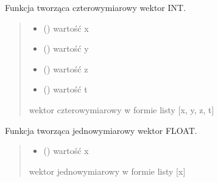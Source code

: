 \documentclass[a4paper,10pt,openany,english]{sphinxmanual}
\begin{document}
\begin{fulllineitems}
\label{\detokenize{js/js-functions:vector4i}}
\pysigstartsignatures
\pysiglinewithargsret
{}
{\sphinxparamcomma {}\sphinxparamcomma {}\sphinxparamcomma {}}
{}
\pysigstopsignatures
\sphinxAtStartPar
Funkcja tworząca czterowymiarowy wektor INT.
\begin{quote}\begin{description}
\begin{itemize}
\item {} 
\sphinxAtStartPar
{} () \textendash{} wartość x

\item {} 
\sphinxAtStartPar
{} () \textendash{} wartość y

\item {} 
\sphinxAtStartPar
{} () \textendash{} wartość z

\item {} 
\sphinxAtStartPar
{} () \textendash{} wartość t

\end{itemize}

\sphinxAtStartPar
wektor czterowymiarowy w formie listy {[}x, y, z, t{]}

\end{description}\end{quote}

\end{fulllineitems}


\begin{fulllineitems}
\label{\detokenize{js/js-functions:vector1f}}
\pysigstartsignatures
\pysiglinewithargsret
{}
{}
{}
\pysigstopsignatures
\sphinxAtStartPar
Funkcja tworząca jednowymiarowy wektor FLOAT.
\begin{quote}\begin{description}
\begin{itemize}
\item {} 
\sphinxAtStartPar
{} () \textendash{} wartość x

\end{itemize}

\sphinxAtStartPar
wektor jednowymiarowy w formie listy {[}x{]}

\end{description}\end{quote}

\end{fulllineitems}
\end{document}
